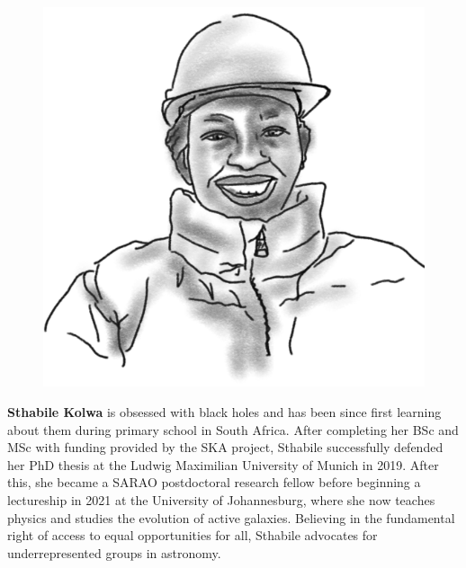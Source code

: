 \begin{figure}
\vspace{15pt}
\includegraphics[width=0.9\linewidth]{portraits/sthabile.png}
\end{figure}
\textbf{Sthabile Kolwa} is obsessed with black holes and has been since first learning about them during primary school in South Africa. After completing her BSc and MSc with funding provided by the SKA project, Sthabile successfully defended her PhD thesis at the Ludwig Maximilian University of Munich in 2019. After this, she became a SARAO postdoctoral research fellow before beginning a lectureship in 2021 at the University of Johannesburg, where she now teaches physics and studies the evolution of active galaxies. Believing in the fundamental right of access to equal opportunities for all, Sthabile advocates for underrepresented groups in astronomy. \\
\\

